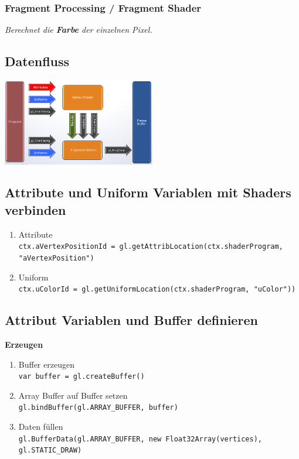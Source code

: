 \subsubsection{Fragment Processing / Fragment Shader}

\textit{
    Berechnet die \textbf{Farbe} der einzelnen Pixel.
}

\subsection{Datenfluss}

\includegraphics[width=0.5\textwidth]{assets/dataprocessing.png}

\subsection{Attribute und Uniform Variablen mit Shaders verbinden}

\begin{enumerate}
	\item Attribute \\
	\texttt{ctx.aVertexPositionId = gl.getAttribLocation(ctx.shaderProgram, "aVertexPosition")}
	
	\item Uniform \\
	\texttt{ctx.uColorId = gl.getUniformLocation(ctx.shaderProgram, "uColor"))}
	
\end{enumerate}

\subsection{Attribut Variablen und Buffer definieren}

\textbf{Erzeugen}

\begin{enumerate}
    \item Buffer erzeugen \\
    \texttt{var buffer = gl.createBuffer()}
    
    \item Array Buffer auf Buffer setzen \\
    \texttt{gl.bindBuffer(gl.ARRAY\_BUFFER, buffer)}
    
    \item Daten füllen \\
    \texttt{gl.BufferData(gl.ARRAY\_BUFFER, new Float32Array(vertices), gl.STATIC\_DRAW)}
\end{enumerate}

